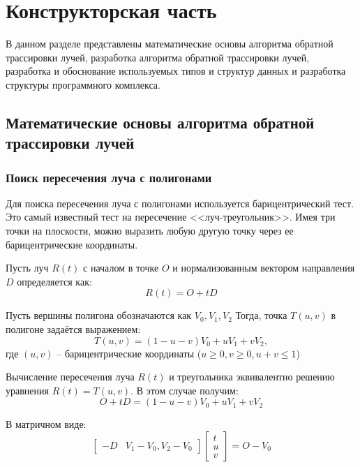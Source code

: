 \chapter{Конструкторская часть}

В данном разделе представлены математические основы алгоритма обратной трассировки лучей, разработка алгоритма обратной трассировки лучей, разработка и обоснование используемых типов и структур данных и разработка структуры программного комплекса.

\section{Математические основы алгоритма обратной трассировки лучей}

\subsection{Поиск пересечения луча с полигонами}

Для поиска пересечения луча с полигонами используется барицентрический тест. Это самый известный тест на пересечение <<луч-треугольник>>. Имея три точки на плоскости, можно выразить любую другую точку через ее барицентрические координаты.

Пусть луч $R(t)$ с началом в точке $O$ и нормализованным вектором направления $D$ определяется как:
\begin{equation}
	R(t) = O + tD
\end{equation}

Пусть вершины полигона обозначаются как $V_0, V_1, V_2$
Тогда, точка $T(u,v)$ в полигоне задаётся выражением:
\begin{equation}
	T(u,v) = (1 - u - v)V_0 + uV_1 + vV_2,
\end{equation}
где $(u,v)$ -- барицентрические координаты ($u \geq 0, v \geq 0, u + v \leq 1$)

Вычисление пересечения луча $R(t)$ и треугольника эквивалентно решению уравнения
$R(t) = T(u, v)$. В этом случае получим:
\begin{equation}
	O + tD = (1- u - v)V_0 + uV_1 + vV_2
\end{equation}

В матричном виде:
\begin{equation}
\label{slau}
\begin{bmatrix}
	-D & V_1 - V_0, V_2 - V_0
\end{bmatrix}
\begin{bmatrix}
t\\
u\\
v
\end{bmatrix} = O - V_0 
\end{equation}

